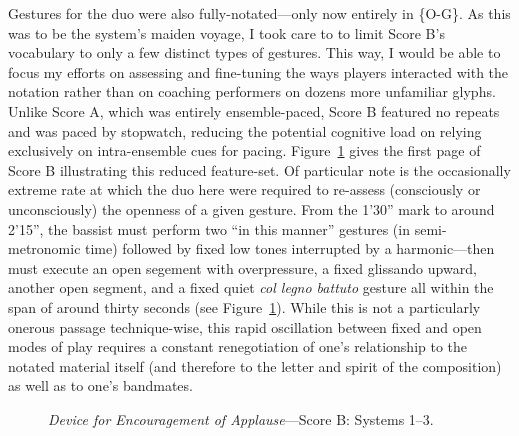     Gestures for the duo were also fully-notated---only now entirely in \{O-G\}. As this was to be the system's maiden voyage, I took care to to limit Score B's vocabulary to only a few distinct types of gestures. This way, I would be able to focus my efforts on assessing and fine-tuning the ways players interacted with the notation rather than on coaching performers on dozens more unfamiliar glyphs. Unlike Score A, which was entirely ensemble-paced, Score B featured no repeats and was paced by stopwatch, reducing the potential cognitive load on relying exclusively on intra-ensemble cues for pacing. Figure~\ref{fig:encouragementB} gives the first page of Score B illustrating this reduced feature-set. Of particular note is the occasionally extreme rate at which the duo here were required to re-assess (consciously or unconsciously) the openness of a given gesture. From the 1'30'' mark to around 2'15'', the bassist must perform two ``in this manner'' gestures (in semi-metronomic time) followed by fixed low tones interrupted by a harmonic---then must execute an open segement with overpressure, a fixed glissando upward, another open segment, and a fixed quiet \textit{col legno battuto} gesture all within the span of around thirty seconds (see Figure~\ref{fig:encouragementB}). While this is not a particularly onerous passage technique-wise, this rapid oscillation between fixed and open modes of play requires a constant renegotiation of one's relationship to the notated material itself (and therefore to the letter and spirit of the composition) as well as to one's bandmates.
    
    \begin{figure}
        \centering
        \captionsetup{width=.5\textwidth}
        \caption{\textit{Device for Encouragement of Applause}---Score B: Systems 1--3.}
        \label{fig:encouragementB}
    \end{figure}

